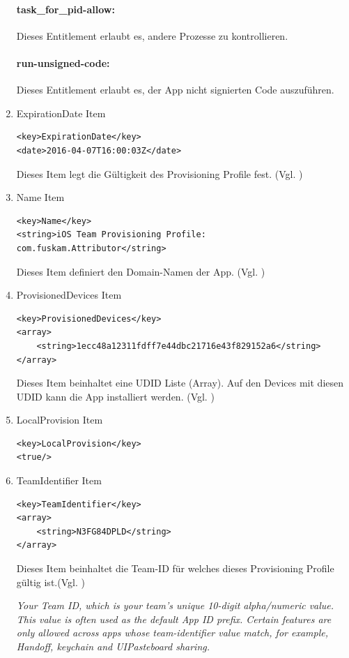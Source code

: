 \begin{enumerate}
\paragraph{task\_for\_pid-allow:} Dieses Entitlement erlaubt es, andere Prozesse zu kontrollieren. 

\paragraph{run-unsigned-code:} Dieses Entitlement erlaubt es, der App nicht signierten Code auszuführen.

    \item ExpirationDate Item
\begin{lstlisting}[captionpos=b, caption={ExpirationDate Item}]
<key>ExpirationDate</key>
<date>2016-04-07T16:00:03Z</date>
\end{lstlisting}
Dieses Item legt die Gültigkeit des Provisioning Profile fest. (Vgl. \cite{iOSSec[5], Hacking[1]})

    \item Name Item
\begin{lstlisting}[captionpos=b, caption={Name Item}]
<key>Name</key>
<string>iOS Team Provisioning Profile: com.fuskam.Attributor</string>
\end{lstlisting}
Dieses Item definiert den Domain-Namen der App. (Vgl. \cite{iOSSec[5], Hacking[1]})

    \item ProvisionedDevices Item
\begin{lstlisting}[captionpos=b, caption={ProvisionedDevices Item}]
<key>ProvisionedDevices</key>
<array>
    <string>1ecc48a12311fdff7e44dbc21716e43f829152a6</string>
</array>
\end{lstlisting}
Dieses Item beinhaltet eine UDID Liste (Array). Auf den Devices mit diesen UDID kann die App installiert werden. (Vgl. \cite{iOSSec[5], Hacking[1]})

  \item LocalProvision Item
\begin{lstlisting}[captionpos=b, caption={LocalProvision Item}]
<key>LocalProvision</key>
<true/>
\end{lstlisting}

    \item TeamIdentifier Item
\begin{lstlisting}[captionpos=b, caption={TeamIdentifier Item}]
<key>TeamIdentifier</key>
<array>
    <string>N3FG84DPLD</string>
</array>
\end{lstlisting}
Dieses Item beinhaltet die Team-ID für welches dieses Provisioning Profile gültig ist.(Vgl. \cite{iOSSec[5], Hacking[1]}) \par
\glqq \textit{Your Team ID, which is your team's unique 10-digit alpha/numeric value. This value is often used as the default App ID prefix. Certain features are only allowed across apps whose team-identifier value match, for example, Handoff, keychain and UIPasteboard sharing.}\grqq{} \cite{ProvisioningProfile[3]}


\end{enumerate}
